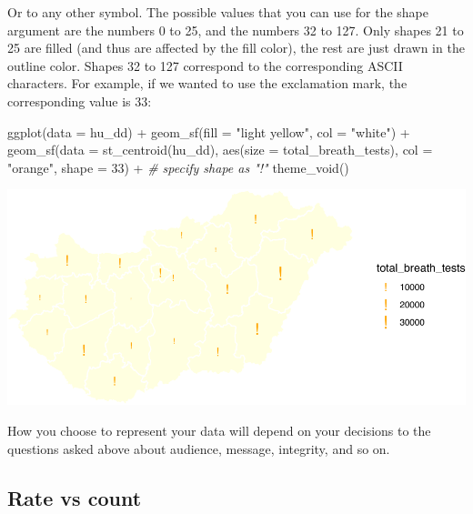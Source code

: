 \documentclass[
  krantz2]{krantz}
\makeatletter
\newenvironment{Shaded}{\begin{snugshade}}{\end{snugshade}}
\newcommand{\AttributeTok}[1]{\textcolor[rgb]{0.61,0.61,0.61}{#1}}
\newcommand{\CommentTok}[1]{\textcolor[rgb]{0.37,0.37,0.37}{\textit{#1}}}
\newcommand{\DecValTok}[1]{\textcolor[rgb]{0.06,0.06,0.06}{#1}}
\newcommand{\FunctionTok}[1]{\textcolor[rgb]{0,0,0}{#1}}
\newcommand{\NormalTok}[1]{#1}
\newcommand{\SpecialCharTok}[1]{\textcolor[rgb]{0,0,0}{#1}}
\newcommand{\StringTok}[1]{\textcolor[rgb]{0.5,0.5,0.5}{#1}}
\newenvironment{kframe}{%
\medskip{}
\setlength{\fboxsep}{.8em}
 \def\at@end@of@kframe{}%
 \ifinner\ifhmode%
  \def\at@end@of@kframe{\end{minipage}}%
  \begin{minipage}{\columnwidth}%
 \fi\fi%
 \def\FrameCommand##1{\hskip\@totalleftmargin \hskip-\fboxsep
 \colorbox{shadecolor}{##1}\hskip-\fboxsep
     \hskip-\linewidth \hskip-\@totalleftmargin \hskip\columnwidth}%
 \MakeFramed {\advance\hsize-\width
   \@totalleftmargin\z@ \linewidth\hsize
   \@setminipage}}%
 {\par\unskip\endMakeFramed%
 \at@end@of@kframe}
\renewenvironment{Shaded}{\begin{kframe}}{\end{kframe}}
\makeatother
\begin{document}
Or to any other symbol. The possible values that you can use for the shape argument are the numbers 0 to 25, and the numbers 32 to 127. Only shapes 21 to 25 are filled (and thus are affected by the fill color), the rest are just drawn in the outline color. Shapes 32 to 127 correspond to the corresponding ASCII characters. For example, if we wanted to use the exclamation mark, the corresponding value is 33:

\begin{Shaded}
\begin{Highlighting}[]
\FunctionTok{ggplot}\NormalTok{(}\AttributeTok{data =}\NormalTok{ hu\_dd) }\SpecialCharTok{+} 
  \FunctionTok{geom\_sf}\NormalTok{(}\AttributeTok{fill =} \StringTok{"light yellow"}\NormalTok{, }
          \AttributeTok{col =} \StringTok{"white"}\NormalTok{) }\SpecialCharTok{+} 
  \FunctionTok{geom\_sf}\NormalTok{(}\AttributeTok{data =} \FunctionTok{st\_centroid}\NormalTok{(hu\_dd), }
          \FunctionTok{aes}\NormalTok{(}\AttributeTok{size =}\NormalTok{ total\_breath\_tests), }
          \AttributeTok{col =} \StringTok{"orange"}\NormalTok{, }
          \AttributeTok{shape =} \DecValTok{33}\NormalTok{) }\SpecialCharTok{+} \CommentTok{\# specify shape as "!"}
  \FunctionTok{theme\_void}\NormalTok{()}
\end{Highlighting}
\end{Shaded}

\includegraphics{crime_mapping_files/figure-latex/gradsymbmapcoldiamond-1.pdf}

How you choose to represent your data will depend on your decisions to the questions asked above about audience, message, integrity, and so on.

\hypertarget{rate-vs-count}{%
\subsection{Rate vs count}\label{rate-vs-count}}
\end{document}
